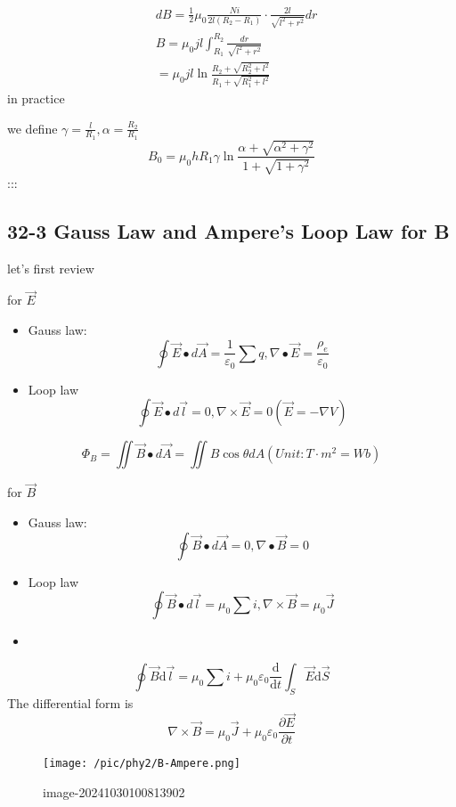 \documentclass[
]{article}
\begin{document}
\[
\begin{aligned}
&dB=\frac{1}{2} \mu_{0} \frac{Ni}{2l(R_{2}-R_{1})}\cdot\frac{2l}{\sqrt{l^{2}+r^{2}}} dr \\
&B=\mu_{0}jl\int_{R_{1}}^{R_{2}}\frac{dr}{\sqrt{l^{2}+r^{2}}} \\
&=\mu_{0}jl\ln\frac{R_{2}+\sqrt{R_{2}^{2}+l^{2}}}{R_{1}+\sqrt{R_{1}^{2}+l^{2}}}
\end{aligned}
\] in practice

we define \(\gamma=\frac{l}{R_1},\alpha =\frac{R_2}{R_1}\) \[
B_0=\mu_0hR_1\gamma \ln \frac{\alpha +\sqrt {\alpha^2+\gamma^2}}{1+\sqrt{1+\gamma^2}}
\] :::

\hypertarget{gauss-law-and-amperes-loop-law-for-b}{%
\subsection{32-3 Gauss Law and Ampere's Loop Law for
B}\label{gauss-law-and-amperes-loop-law-for-b}}

let's first review

for \(\vec E\)

\begin{itemize}
\item
  Gauss law: \[
  \oint\vec{E}\bullet d\vec{A}=\frac1{\varepsilon_0}\sum q, \nabla\bullet\vec{E}=\frac{\rho_e}{\varepsilon_0}
  \]
\item
  Loop law \[
  \oint \vec E\bullet d\vec l =0,\nabla \times \vec E=0(\vec E=-\nabla V)
  \]
\end{itemize}

\[
\Phi_B=\iint\vec{B}\bullet d\vec{A}=\iint B\cos\theta dA(Unit :T\cdot m^2=Wb)
\]

for \(\vec B\)

\begin{itemize}
\item
  Gauss law: \[
  \oint\vec{B}\bullet d\vec{A}=0, \nabla\bullet\vec{B}=0
  \]
\item
  Loop law \[
  \oint \vec B\bullet d\vec l =\mu _0\sum i,\nabla \times \vec B=\mu_0\vec J
  \]
\item
\end{itemize}

\[
\oint \vec B\mathrm d \vec l =\mu_0\sum i+\mu_0\varepsilon_0\frac{\mathrm d}{\mathrm dt}\int _S\vec E\mathrm d \vec S
\] The differential form is \[
\nabla \times \vec B =\mu_0\vec J+\mu_0\varepsilon _0\frac{\partial \vec E}{\partial t}
\]

\begin{figure}
\centering
\texttt{[image: /pic/phy2/B-Ampere.png]}
\caption{image-20241030100813902}
\end{figure}
\end{document}

